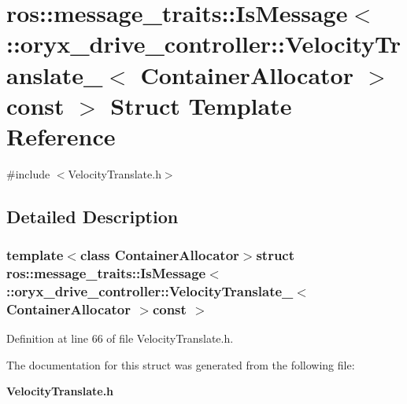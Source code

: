 \section{ros\-:\-:message\-\_\-traits\-:\-:\-Is\-Message$<$ \-:\-:oryx\-\_\-drive\-\_\-controller\-:\-:\-Velocity\-Translate\-\_\-$<$ \-Container\-Allocator $>$const $>$ \-Struct \-Template \-Reference}
\label{structros_1_1message__traits_1_1IsMessage_3_01_1_1oryx__drive__controller_1_1VelocityTranslate__1056a0f06428a8505ce8412610ecb0bd}


{\ttfamily \#include $<$\-Velocity\-Translate.\-h$>$}



\subsection{\-Detailed \-Description}
\subsubsection*{template$<$class Container\-Allocator$>$struct ros\-::message\-\_\-traits\-::\-Is\-Message$<$ \-::oryx\-\_\-drive\-\_\-controller\-::\-Velocity\-Translate\-\_\-$<$ Container\-Allocator $>$const  $>$}



\-Definition at line 66 of file \-Velocity\-Translate.\-h.



\-The documentation for this struct was generated from the following file\-:\begin{DoxyCompactItemize}
\item 
{\bf \-Velocity\-Translate.\-h}\end{DoxyCompactItemize}
